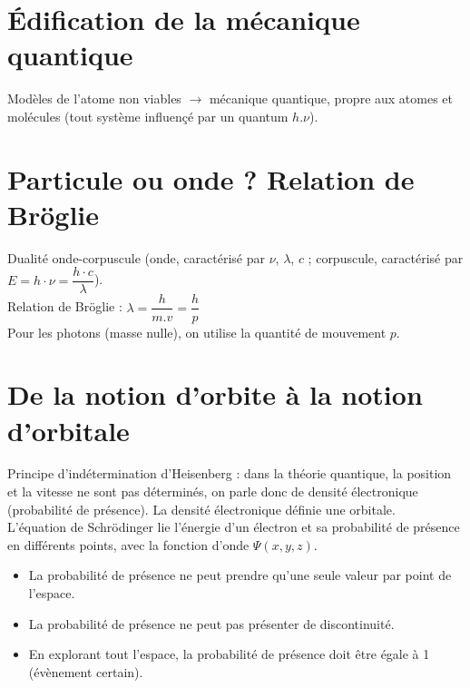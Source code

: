 \documentclass[13pt, twoside, a4paper, french, tikz]{report}
\begin{document}
  
  \section{Édification de la mécanique quantique}\label{sec:edification-de-la-mecanique-quantique}
    
    Modèles de l'atome non viables $\rightarrow$ mécanique quantique, propre aux atomes et molécules (tout système influençé par un quantum $h.\nu$).
  
  
  \section{Particule ou onde ? Relation de Bröglie}\label{sec:particule-ou-onde-?-relation-de-broglie}
    
    Dualité onde-corpuscule (onde, caractérisé par $\nu$, $\lambda$, $c$ ; corpuscule, caractérisé par $E = h \cdot \nu = \dfrac{h \cdot c}{\lambda}$).\\
    Relation de Bröglie : $\lambda = \dfrac{h}{m . v} = \dfrac{h}{p}$\\
    Pour les photons (masse nulle), on utilise la quantité de mouvement $p$.
  
  
  \section{De la notion d'orbite à la notion d'orbitale}\label{sec:de-la-notion-dorbite-a-la-notion-dorbitale}
    
    Principe d'indétermination d'Heisenberg : dans la théorie quantique, la position et la vitesse ne sont pas déterminés, on parle donc de densité électronique (probabilité de présence).
    La densité électronique définie une orbitale.\\
    
    L'équation de Schrödinger lie l'énergie d'un électron et sa probabilité de présence en différents points, avec la fonction d'onde $\Psi(x, y, z)$.
    \begin{itemize}
      \item La probabilité de présence ne peut prendre qu'une seule valeur par point de l'espace.
      \item La probabilité de présence ne peut pas présenter de discontinuité.
      \item En explorant tout l'espace, la probabilité de présence doit être égale à 1 (évènement certain).
    \end{itemize}
    
\end{document}
